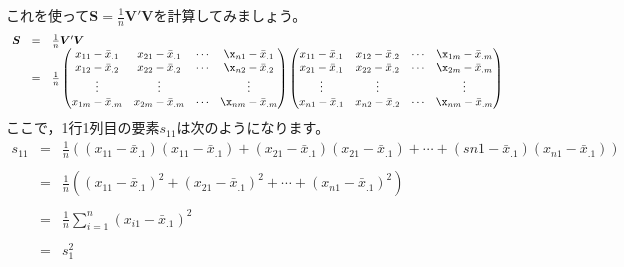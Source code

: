 \documentclass{ltjsbook}
\begin{document}
これを使って$\bm{S}=\frac{1}{n}\bm{V}'\bm{V}$を計算してみましょう。
\[
	\begin{array}{ccl}
		\bm{S} & = & \frac{1}{n} \bm{V}' \bm{V} \\
		       & = & \frac{1}{n}
		\begin{pmatrix}
			x_{11} - \bar{x}_{.1} & x_{21} - \bar{x}_{.1} & \cdots & \x_{n1} - \bar{x}_{.1} \\
			x_{12} - \bar{x}_{.2} & x_{22} - \bar{x}_{.2} & \cdots & \x_{n2} - \bar{x}_{.2} \\
			\vdots                & \vdots                &        & \vdots                 \\
			x_{1m} - \bar{x}_{.m} & x_{2m} - \bar{x}_{.m} & \cdots & \x_{nm} - \bar{x}_{.m} \\
		\end{pmatrix}
		\begin{pmatrix}
			x_{11} - \bar{x}_{.1} & x_{12} - \bar{x}_{.2} & \cdots & \x_{1m} - \bar{x}_{.m} \\
			x_{21} - \bar{x}_{.1} & x_{22} - \bar{x}_{.2} & \cdots & \x_{2m} - \bar{x}_{.m} \\
			\vdots                & \vdots                &        & \vdots                 \\
			x_{n1} - \bar{x}_{.1} & x_{n2} - \bar{x}_{.2} & \cdots & \x_{nm} - \bar{x}_{.m} \\
		\end{pmatrix}
	\end{array}
\]
ここで，1行1列目の要素$s_{11}$は次のようになります。
\[ \begin{array}{ccl}
		s_{11} & = & \frac{1}{n}\left( (x_{11}-\bar{x}_{.1})(x_{11}-\bar{x}_{.1}) +
		(x_{21}-\bar{x}_{.1})(x_{21}-\bar{x}_{.1}) +\cdots+(s{n1}-\bar{x}_{.1})(x_{n1}-\bar{x}_{.1}) \right)                       \\
		       &   &                                                                                                               \\
		       & = & \frac{1}{n}\left( (x_{11}-\bar{x}_{.1})^2 + (x_{21}-\bar{x}_{.1})^2 + \cdots +(x_{n1}-\bar{x}_{.1})^2 \right) \\
		       &   &                                                                                                               \\
		       & = & \frac{1}{n}\sum_{i=1}^n (x_{i1}-\bar{x}_{.1} )^2                                                              \\
		       &   &                                                                                                               \\
		       & = & s_1^2
	\end{array}
\]
\end{document}
